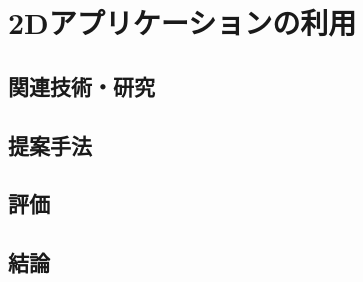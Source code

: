 \chapter{2Dアプリケーションの利用}
\label{chapter:2d}

\section{関連技術・研究}


\section{提案手法}


\section{評価}


\section{結論}
